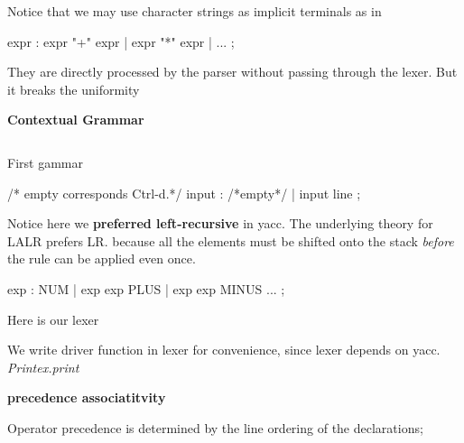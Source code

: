 Notice that we may use character strings as implicit terminals as in 
\begin{ocamlcode}
expr : expr "+" expr {}
     | expr "*" expr {}
     | ... ;
\end{ocamlcode}
They are directly processed by the parser without passing through the
lexer. But it breaks the uniformity

\textbf{Contextual Grammar}

\inputminted[fontsize=\scriptsize, fontsize=\scriptsize, ]{ocaml}{code/context.ml}


First gammar
\begin{ocamlcode}
  /* empty corresponds Ctrl-d.*/
  input : /*empty*/ {} | input line {}; 
\end{ocamlcode}

Notice here we \textbf{preferred left-recursive} in yacc.
The underlying theory for LALR prefers LR. because all the elements
must be shifted onto the stack \textit{before} the rule can be applied even once.

\begin{ocamlcode}
  exp : NUM | exp exp PLUS | exp exp MINUS  ... ; 
\end{ocamlcode}

Here is our lexer

We write driver function in lexer for convenience, since lexer depends
on yacc. \textit{Printex.print}

\textbf{precedence associatitvity }

Operator precedence is determined by the line ordering of the
declarations; 

